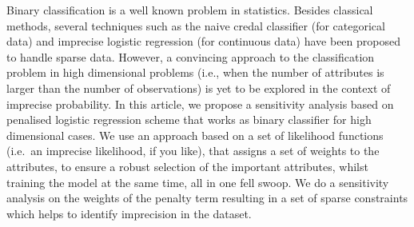 
Binary classification is a well known problem in statistics. 
Besides classical methods, several techniques such as
the naive credal classifier (for categorical data) and imprecise logistic 
regression (for continuous data) have been proposed
to handle sparse data.
However, a convincing approach to the
classification problem in high dimensional problems (i.e., when the 
number of attributes is larger than the number of observations) is yet to
be explored in the context of imprecise probability. In this
article, we propose a sensitivity analysis based on penalised logistic regression
scheme that works as binary classifier for high dimensional cases.
We use an approach based on a set of likelihood functions (i.e.~an imprecise likelihood, 
if you like),  that assigns a set of weights to the attributes,
to ensure a robust selection of the important attributes,
whilst training the model at the same time, all in one fell swoop.
We do a sensitivity analysis on the weights of the penalty term resulting
in a set of sparse constraints which helps to identify imprecision in the dataset.


